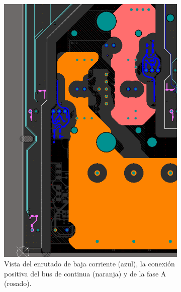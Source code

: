 \begin{figure}[H]
	\centering
	\begin{subfigure}{0.4\linewidth}
		\centering
		\includegraphics[width=\linewidth]{fig/ts+bot}
		\caption{Vista del enrutado de baja corriente (azul), la conexión positiva del bus de continua (naranja) y de la fase A (rosado).}
	\end{subfigure}
	\hfill
	\begin{subfigure}{0.4\linewidth}
		\centering

\end{subfigure}
\end{figure}

